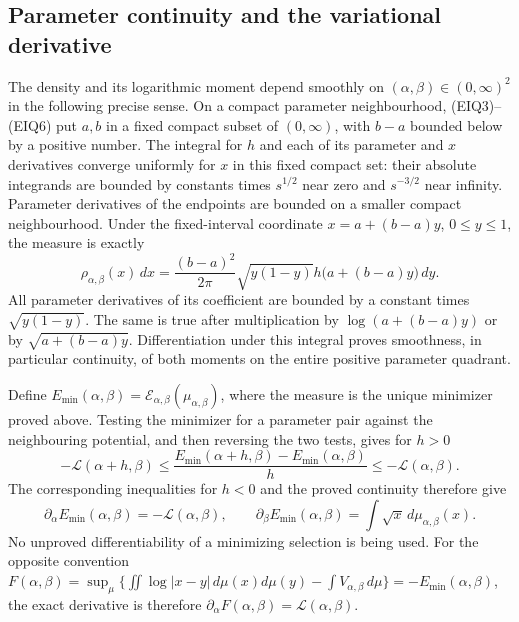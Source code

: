 \documentclass[11pt,a4paper]{article}
\begin{document}
\subsection{Parameter continuity and the variational derivative}
The density and its logarithmic moment depend smoothly on
$(\alpha,\beta)\in(0,\infty)^2$ in the following precise sense.
On a compact parameter neighbourhood, (EIQ3)--(EIQ6) put $a,b$ in a
fixed compact subset of $(0,\infty)$, with $b-a$ bounded below by a
positive number.  The integral for $h$ and each of its parameter and
$x$ derivatives converge uniformly for $x$ in this fixed compact set:
their absolute integrands are bounded by constants times $s^{1/2}$
near zero and $s^{-3/2}$ near infinity. Parameter derivatives of the
endpoints are bounded on a smaller compact neighbourhood.
Under the fixed-interval coordinate
$x=a+(b-a)y$, $0\leq y\leq1$, the measure is exactly
\begin{equation}\tag{EIQ29}
 \rho_{\alpha,\beta}(x)\,dx
 =\frac{(b-a)^2}{2\pi}\sqrt{y(1-y)}
                  h\bigl(a+(b-a)y\bigr)\,dy.
\end{equation}
All parameter derivatives of its coefficient are bounded by a constant
times $\sqrt{y(1-y)}$. The same is true after multiplication by
$\log(a+(b-a)y)$ or by $\sqrt{a+(b-a)y}$.
Differentiation under this integral proves smoothness, in particular
continuity, of both moments on the entire positive parameter quadrant.

Define $E_{\min}(\alpha,\beta)=\mathcal E_{\alpha,\beta}(\mu_{\alpha,\beta})$,
where the measure is the unique minimizer proved above.
Testing the minimizer for a parameter pair against the neighbouring
potential, and then reversing the two tests, gives for $h>0$
\[
 -\mathcal L(\alpha+h,\beta)
 \leq\frac{E_{\min}(\alpha+h,\beta)-E_{\min}(\alpha,\beta)}h
 \leq-\mathcal L(\alpha,\beta).
\]
The corresponding inequalities for $h<0$ and the proved continuity
therefore give
\begin{equation}\tag{EIQ30}
 \partial_\alpha E_{\min}(\alpha,\beta)=-\mathcal L(\alpha,\beta),\qquad
 \partial_\beta E_{\min}(\alpha,\beta)
        =\int\sqrt{x}\,d\mu_{\alpha,\beta}(x).
\end{equation}
No unproved differentiability of a minimizing selection is being used.
For the opposite convention
$F(\alpha,\beta)=\sup_\mu\{\iint\log|x-y|\,d\mu(x)d\mu(y)
-\int V_{\alpha,\beta}\,d\mu\}=-E_{\min}(\alpha,\beta)$,
the exact derivative is therefore
$\partial_\alpha F(\alpha,\beta)=\mathcal L(\alpha,\beta)$.
\end{document}
